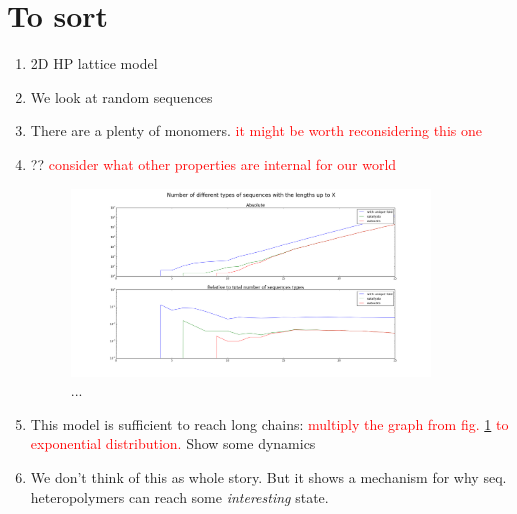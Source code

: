 \documentclass[12pt]{paper}
\newcommand{\red}[1]{\textcolor{red}{#1}}
\begin{document}
 \section{To sort}
 
 \begin{enumerate}
   \item 2D HP lattice model
   \item We look at random sequences
   \item There are a plenty of monomers.   \red{it might be worth reconsidering this one}
   \item ??   \red{consider what other properties are internal for our world}
   \begin{figure}[h!]
     \centering
     \includegraphics[width=0.9\textwidth]{pictures/hp-statistics.png} 
     \caption{...}\label{fig:hp-stat}
   \end{figure}
   \item This model is sufficient to reach long chains: \red{multiply the graph from 
     fig. \ref{fig:hp-stat} to exponential distribution.}
   \subitem \textbullet Show some dynamics
   \item We don't think of this as whole story. 
   \subitem \textbullet But it shows a mechanism for why seq. heteropolymers can reach some 
   \textit{interesting} state.
 \end{enumerate}

 
 
\end{document}
